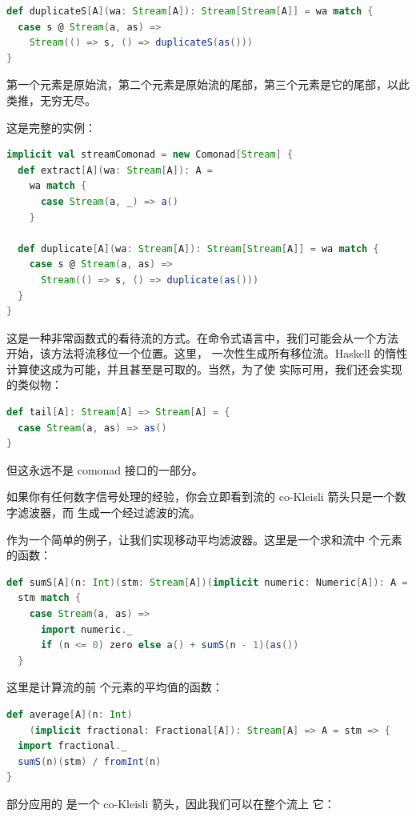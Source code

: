 \begin{lstlisting}[language=Scala]
def duplicateS[A](wa: Stream[A]): Stream[Stream[A]] = wa match {
  case s @ Stream(a, as) =>
    Stream(() => s, () => duplicateS(as()))
}
\end{lstlisting}
第一个元素是原始流，第二个元素是原始流的尾部，第三个元素是它的尾部，以此类推，无穷无尽。

这是完整的实例：

\begin{lstlisting}[language=Scala]
implicit val streamComonad = new Comonad[Stream] {
  def extract[A](wa: Stream[A]): A =
    wa match {
      case Stream(a, _) => a()
    }

  def duplicate[A](wa: Stream[A]): Stream[Stream[A]] = wa match {
    case s @ Stream(a, as) =>
      Stream(() => s, () => duplicate(as()))
  }
}
\end{lstlisting}
这是一种非常函数式的看待流的方式。在命令式语言中，我们可能会从一个方法  开始，该方法将流移位一个位置。这里， 一次性生成所有移位流。Haskell 的惰性计算使这成为可能，并且甚至是可取的。当然，为了使  实际可用，我们还会实现  的类似物：

\begin{lstlisting}[language=Scala]
def tail[A]: Stream[A] => Stream[A] = {
  case Stream(a, as) => as()
}
\end{lstlisting}
但这永远不是 comonad 接口的一部分。

如果你有任何数字信号处理的经验，你会立即看到流的 co-Kleisli 箭头只是一个数字滤波器，而  生成一个经过滤波的流。

作为一个简单的例子，让我们实现移动平均滤波器。这里是一个求和流中  个元素的函数：

\begin{lstlisting}[language=Scala]
def sumS[A](n: Int)(stm: Stream[A])(implicit numeric: Numeric[A]): A =
  stm match {
    case Stream(a, as) =>
      import numeric._
      if (n <= 0) zero else a() + sumS(n - 1)(as())
  }
\end{lstlisting}
这里是计算流的前  个元素的平均值的函数：

\begin{lstlisting}[language=Scala]
def average[A](n: Int)
    (implicit fractional: Fractional[A]): Stream[A] => A = stm => {
  import fractional._
  sumS(n)(stm) / fromInt(n)
}
\end{lstlisting}
部分应用的  是一个 co-Kleisli 箭头，因此我们可以在整个流上  它：

